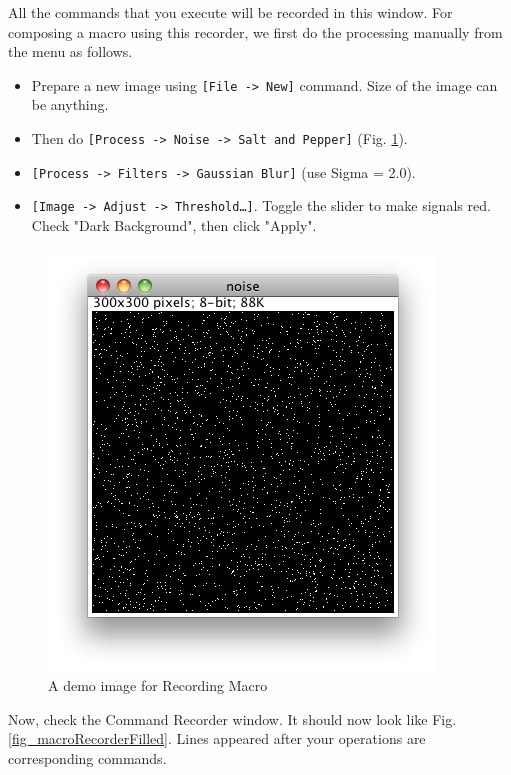 \documentclass[11pt,a4paper,oneside]{report}
\newcommand{\ijmenu}[1]{\texttt{\small#1}}
\begin{document}
All the commands that you execute will be recorded in this window. 
For composing a macro using this recorder, we first do the processing
manually from the menu as follows. 
\begin{itemize}
  \item Prepare a new image using \ijmenu{[File -> New]} command. Size of the
  image can be anything.
  \item Then do \ijmenu{[Process -> Noise -> Salt and Pepper]} (Fig.
  \ref{fig_SaltAndPepper}).
  \item \ijmenu{[Process -> Filters -> Gaussian Blur]} (use Sigma = 2.0).
  \item \ijmenu{[Image -> Adjust -> Threshold\ldots]}. Toggle the slider to make
  signals red. Check "Dark Background", then click "Apply".
\end{itemize}
 
\begin{figure}[htbp]
\begin{center}
\includegraphics[scale=0.6]{fig/SaltandPepper300.png}
\caption{A demo image for Recording Macro} 
\label{fig_SaltAndPepper}
\end{center}
\end{figure}

Now, check the Command Recorder window. 
It should now look like Fig. \ref{fig_macroRecorderFilled}. 
Lines appeared after your operations are corresponding commands.
\end{document}
